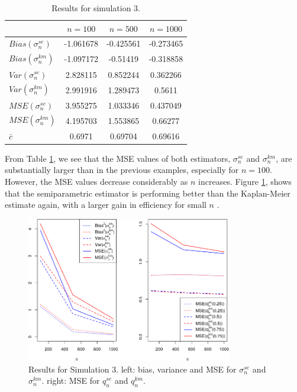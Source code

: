 \begin{table}[h!]
	\begin{center}

	\begin{tabular}{| l || c | c | c |}	
		\hline
		& $ n = 100 $ & $ n = 500 $ & $ n = 1000 $\\
		\hline
		\hline
		$Bias(\sigma_n^{se})$ & -1.061678 & -0.425561 & -0.273465\\
		$Bias(\sigma_n^{km})$ & -1.097172 & -0.51419 & -0.318858\\
		\hline
		$Var(\sigma_n^{se})$ & 2.828115 & 0.852244 & 0.362266\\
		$Var(\sigma_n^{km})$ & 2.991916 & 1.289473 & 0.5611\\
		\hline
		$MSE(\sigma_n^{se})$ & 3.955275 & 1.033346 & 0.437049\\
		$MSE(\sigma_n^{km})$ & 4.195703 & 1.553865 & 0.66277\\
		\hline
		\hline
		$\bar c$ & 0.6971 & 0.69704 & 0.69616\\
		\hline
	\end{tabular}
	\end{center}
	\caption{Results for simulation 3.}
	\label{tab:res_exppar1}
\end{table}
%
\noindent From Table \ref{tab:res_exppar1}, we see that the MSE values of both estimators,  $\sigma_n^{se}$ and $\sigma_n^{km}$, are substantially larger than in the previous examples, especially for $n=100$. However, the MSE values decrease considerably as $n$ increases. Figure \ref{fig:mse_exppar}, shows that the semiparametric estimator is performing better than the Kaplan-Meier estimate again, with a larger gain in efficiency for small $n$ .
\begin{figure}[h!]
	\begin{center}
		\includegraphics[width=0.8\textwidth]{./figures/exppar_mse2}
	\end{center}
	\caption{Results for Simulation 3. left: bias, variance and MSE for $\sigma_n^{se}$ and $\sigma_n^{km}$. right: MSE for $q_n^{se}$ and $q_n^{km}$.}
	\label{fig:mse_exppar}
\end{figure}
